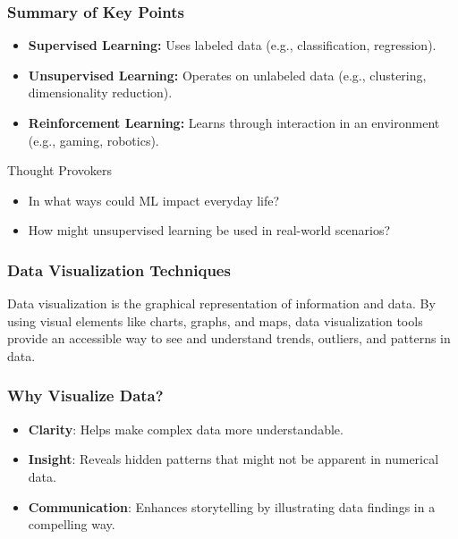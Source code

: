 \documentclass[aspectratio=169]{beamer}
\begin{document}
\begin{frame}[fragile]
    \frametitle{Summary of Key Points}
    \begin{itemize}
        \item \textbf{Supervised Learning:} Uses labeled data (e.g., classification, regression).
        \item \textbf{Unsupervised Learning:} Operates on unlabeled data (e.g., clustering, dimensionality reduction).
        \item \textbf{Reinforcement Learning:} Learns through interaction in an environment (e.g., gaming, robotics).
    \end{itemize}
    \begin{block}{Thought Provokers}
        \begin{itemize}
            \item In what ways could ML impact everyday life?
            \item How might unsupervised learning be used in real-world scenarios?
        \end{itemize}
    \end{block}
\end{frame}

\begin{frame}[fragile]
    \frametitle{Data Visualization Techniques}
    Data visualization is the graphical representation of information and data. By using visual elements like charts, graphs, and maps, data visualization tools provide an accessible way to see and understand trends, outliers, and patterns in data.
\end{frame}

\begin{frame}[fragile]
    \frametitle{Why Visualize Data?}
    \begin{itemize}
        \item \textbf{Clarity}: Helps make complex data more understandable.
        \item \textbf{Insight}: Reveals hidden patterns that might not be apparent in numerical data.
        \item \textbf{Communication}: Enhances storytelling by illustrating data findings in a compelling way.
    \end{itemize}
\end{frame}
\end{document}
